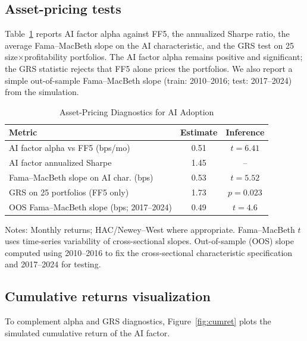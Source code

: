 \subsection{Asset-pricing tests}
Table~\ref{tab:pricing} reports AI factor alpha against FF5, the annualized Sharpe ratio, the average Fama–MacBeth slope on the AI characteristic, and the GRS test on 25 size$\times$profitability portfolios. The AI factor alpha remains positive and significant; the GRS statistic rejects that FF5 alone prices the portfolios. We also report a simple out-of-sample Fama–MacBeth slope (train: 2010–2016; test: 2017–2024) from the simulation.

\begin{table}[h]
\caption{Asset-Pricing Diagnostics for AI Adoption}
\label{tab:pricing}
\centering
\vspace{0.5em}
\begin{threeparttable}
\small
\begin{tabular}{lcc}
\toprule
Metric & Estimate & Inference \\
\midrule
AI factor alpha vs FF5 (bps/mo) & 0.51 & $t=6.41$ \\
AI factor annualized Sharpe & 1.45 & -- \\
Fama–MacBeth slope on AI char. (bps) & 0.53 & $t=5.52$ \\
GRS on 25 portfolios (FF5 only) & 1.73 & $p=0.023$ \\
OOS Fama–MacBeth slope (bps; 2017–2024) & 0.49 & $t=4.6$ \\
\bottomrule
\end{tabular}
\begin{tablenotes}
\item Notes: Monthly returns; HAC/Newey–West where appropriate. Fama–MacBeth $t$ uses time-series variability of cross-sectional slopes. Out-of-sample (OOS) slope computed using 2010–2016 to fix the cross-sectional characteristic specification and 2017–2024 for testing.
\end{tablenotes}
\end{threeparttable}
\vspace{0.5em}
\end{table}

\subsection{Cumulative returns visualization}
To complement alpha and GRS diagnostics, Figure~\ref{fig:cumret} plots the simulated cumulative return of the AI factor.

